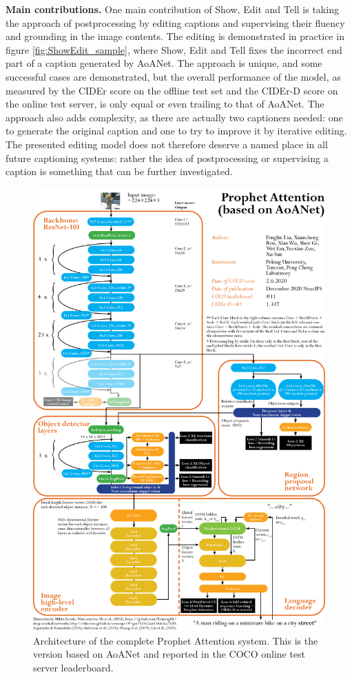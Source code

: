 \documentclass[english,twoside,openright]{HYgraduMLDS}
\begin{document}
\textbf{Main contributions.}
One main contribution of Show, Edit and Tell is taking the approach of postprocessing by editing captions and supervising their fluency and grounding in the image contents. The editing is demonstrated in practice in figure \ref{fig:ShowEdit_sample}, where Show, Edit and Tell fixes the incorrect end part of a caption generated by AoANet. The approach is unique, and some successful cases are demonstrated, but the overall performance of the model, as measured by the CIDEr score on the offline test set and the CIDEr-D score on the online test server, is only equal or even trailing to that of AoANet. The approach also adds complexity, as there are actually two captioners needed: one to generate the original caption and one to try to improve it by iterative editing. The presented editing model does not therefore deserve a named place in all future captioning systems: rather the idea of postprocessing or supervising a caption is something that can be further investigated.

\pagebreak
\begin{figure}[H] 
\centering
\includegraphics[width=1.0\textwidth]{./images-indesign/Architecture_Prophet.png}
\caption{Architecture of the complete Prophet Attention system. This is the version based on AoANet and reported in the COCO online test server leaderboard.}
\label{fig:architecture_Prophet} 
\end{figure}
\end{document}

